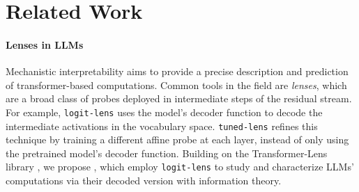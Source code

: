 \section{Related Work} \label{sec:related}
\paragraph{Lenses in LLMs} Mechanistic interpretability \citep{bereska2024mechanisticinterpretabilityaisafety} aims to provide a precise description and prediction of transformer-based computations. Common tools in the field are \textit{lenses}, which are a broad class of probes deployed in intermediate steps of the residual stream. For example, \texttt{logit-lens} \citep{nostalgebraist2020} uses the model's decoder function to decode the intermediate activations in the vocabulary space. \texttt{tuned-lens} \citep{belrose2023elicitinglatentpredictionstransformers} refines this technique by training a different affine probe at each layer, instead of only using the pretrained model's decoder function. Building on the Transformer-Lens library \citep{nanda2022transformerlens}, we propose \entropylens, which employ \texttt{logit-lens} to study and characterize LLMs' computations via their decoded version with information theory. %

